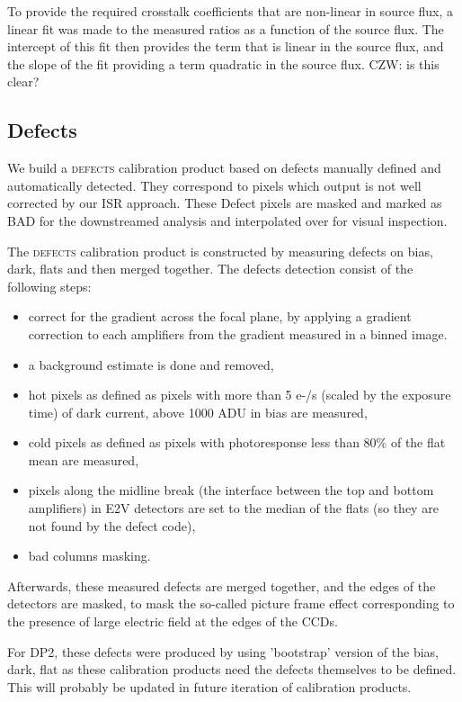 To provide the required crosstalk coefficients that are non-linear in source flux, a linear fit was made to the measured ratios as a function of the source flux.
The intercept of this fit then provides the term that is linear in the source flux, and the slope of the fit providing a term quadratic in the source flux.
CZW: is this clear?

\subsection{Defects} \label{sec:processing:calibration:defects}

We build a \textsc{defects} calibration product based on defects manually defined and automatically detected.
They correspond to pixels which output is not well corrected by our ISR approach.
These Defect pixels are masked and marked as \textsc{BAD} for the downstreamed analysis and interpolated over for visual inspection.

The \textsc{defects} calibration product is constructed by measuring defects on bias, dark, flats and then merged together.
The defects detection consist of the following steps:
\begin{itemize}
    \item correct for the gradient across the focal plane, by applying a gradient correction to each amplifiers
    from the gradient measured in a binned image.
    \item a background estimate is done and removed,
    \item hot pixels as defined as pixels with more than 5 e-/s (scaled by the exposure time) of dark current, above 1000 ADU in bias are measured,
    \item cold pixels as defined as pixels with photoresponse less than $80\%$ of the flat mean are measured,
    \item pixels along the midline break (the interface between the top and bottom amplifiers) in E2V detectors are
    set to the median of the flats (so they are not found by the defect code),
    \item bad columns masking.
\end{itemize}

Afterwards, these measured defects are merged together, and the edges of the detectors are masked, to
mask the so-called picture frame effect corresponding to the presence of large electric field at the edges of the CCDs.

For DP2, these defects were produced by using 'bootstrap' version of the bias, dark, flat as these calibration products need the defects themselves to be defined.
This will probably be updated in future iteration of calibration products.

